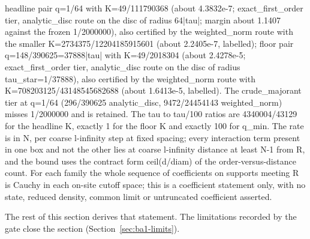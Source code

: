 \begin{gatequote}
headline pair q=1/64 with K=49/111790368 (about 4.3832e-7; exact\_first\_order
tier, analytic\_disc route on the disc of radius 64|tau|; margin about 1.1407
against the frozen 1/2000000), also certified by the weighted\_norm route with
the smaller K=2734375/12204185915601 (about 2.2405e-7, labelled); floor pair
q=148/390625=37888|tau| with K=49/2018304 (about 2.4278e-5;
exact\_first\_order tier, analytic\_disc route on the disc of radius
tau\_star=1/37888), also certified by the weighted\_norm route with
K=708203125/43148545682688 (about 1.6413e-5, labelled). The crude\_majorant
tier at q=1/64 (296/390625 analytic\_disc, 9472/24454143 weighted\_norm)
misses 1/2000000 and is retained. The tau to tau/100 ratios are 4340004/43129
for the headline K, exactly 1 for the floor K and exactly 100 for q\_min. The
rate is in N, per coarse l-infinity step at fixed spacing; every interaction
term present in one box and not the other lies at coarse l-infinity distance
at least N-1 from R, and the bound uses the contract form ceil(d/diam) of the
order-versus-distance count. For each family the whole sequence of
coefficients on supports meeting R is Cauchy in each on-site cutoff space;
this is a coefficient statement only, with no state, reduced density, common
limit or untruncated coefficient asserted.
\end{gatequote}
The rest of this section derives that statement. The limitations recorded by
the gate close the section (Section~\ref{sec:ba1-limits}).

